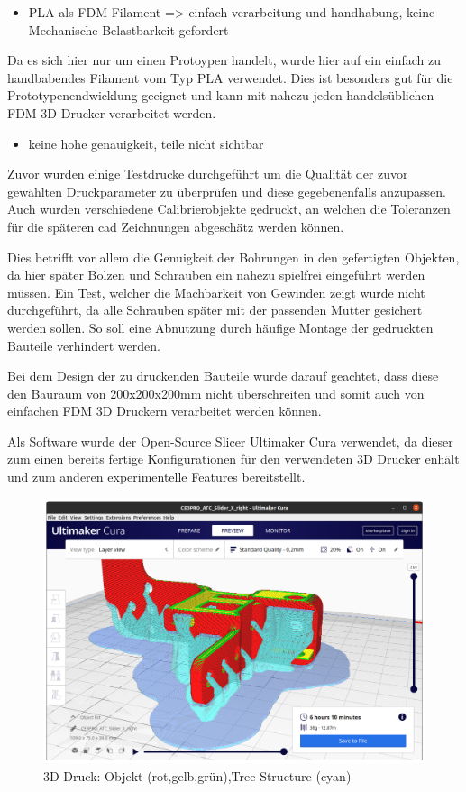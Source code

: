 \begin{itemize}
\tightlist
\item
  PLA als FDM Filament =\textgreater{} einfach verarbeitung und
  handhabung, keine Mechanische Belastbarkeit gefordert
\end{itemize}

Da es sich hier nur um einen Protoypen handelt, wurde hier auf ein
einfach zu handbabendes Filament vom Typ PLA verwendet. Dies ist
besonders gut für die Prototypenendwicklung geeignet und kann mit nahezu
jeden handelsüblichen FDM 3D Drucker verarbeitet werden.

\begin{itemize}
\tightlist
\item
  keine hohe genauigkeit, teile nicht sichtbar
\end{itemize}

Zuvor wurden einige Testdrucke durchgeführt um die Qualität der zuvor
gewählten Druckparameter zu überprüfen und diese gegebenenfalls
anzupassen. Auch wurden verschiedene Calibrierobjekte gedruckt, an
welchen die Toleranzen für die späteren \gls{cad} Zeichnungen abgeschätz
werden können.

Dies betrifft vor allem die Genuigkeit der Bohrungen in den gefertigten
Objekten, da hier später Bolzen und Schrauben ein nahezu spielfrei
eingeführt werden müssen. Ein Test, welcher die Machbarkeit von Gewinden
zeigt wurde nicht durchgeführt, da alle Schrauben später mit der
passenden Mutter gesichert werden sollen. So soll eine Abnutzung durch
häufige Montage der gedruckten Bauteile verhindert werden.

Bei dem Design der zu druckenden Bauteile wurde darauf geachtet, dass
diese den Bauraum von 200x200x200mm nicht überschreiten und somit auch
von einfachen FDM 3D Druckern verarbeitet werden können.

Als Software wurde der Open-Source Slicer Ultimaker Cura
\cite{ultimakercura} verwendet, da dieser zum einen bereits fertige
Konfigurationen für den verwendeten 3D Drucker enhält und zum anderen
experimentelle Features bereitstellt.

\begin{figure}
\centering
\includegraphics{images/3d_print_tree_structure.png}
\caption{3D Druck: Objekt (rot,gelb,grün),Tree Structure (cyan)}
\end{figure}

